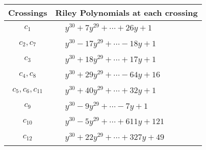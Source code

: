 \documentclass[1p]{elsarticle_modified}
\theoremstyle{definition}
\begin{document}
\begin{tabular}{m{50pt}|m{274pt}}
Crossings & \hspace{64pt}Riley Polynomials at each crossing \\
\hline $$\begin{aligned}c_{1}\end{aligned}$$&$\begin{aligned}
&y^{30}+7 y^{29}+\cdots+26 y+1
\end{aligned}$\\
\hline $$\begin{aligned}c_{2},c_{7}\end{aligned}$$&$\begin{aligned}
&y^{30}-17 y^{29}+\cdots-18 y+1
\end{aligned}$\\
\hline $$\begin{aligned}c_{3}\end{aligned}$$&$\begin{aligned}
&y^{30}+18 y^{29}+\cdots+17 y+1
\end{aligned}$\\
\hline $$\begin{aligned}c_{4},c_{8}\end{aligned}$$&$\begin{aligned}
&y^{30}+29 y^{29}+\cdots-64 y+16
\end{aligned}$\\
\hline $$\begin{aligned}c_{5},c_{6},c_{11}\end{aligned}$$&$\begin{aligned}
&y^{30}+40 y^{29}+\cdots+32 y+1
\end{aligned}$\\
\hline $$\begin{aligned}c_{9}\end{aligned}$$&$\begin{aligned}
&y^{30}-9 y^{29}+\cdots-7 y+1
\end{aligned}$\\
\hline $$\begin{aligned}c_{10}\end{aligned}$$&$\begin{aligned}
&y^{30}-5 y^{29}+\cdots+611 y+121
\end{aligned}$\\
\hline $$\begin{aligned}c_{12}\end{aligned}$$&$\begin{aligned}
&y^{30}+22 y^{29}+\cdots+327 y+49
\end{aligned}$\\
\hline
\end{tabular}\\~\\
\end{document}
